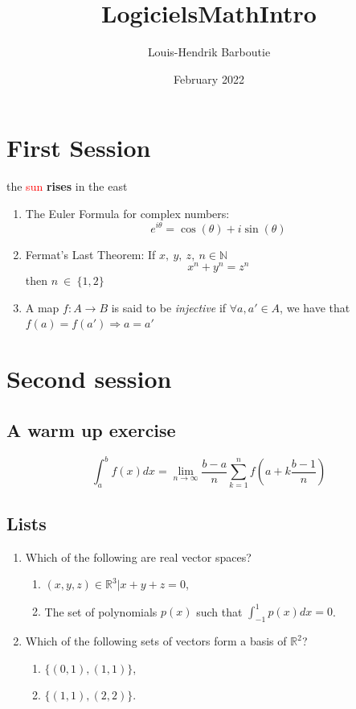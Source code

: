 \documentclass{article} %
\title{LogicielsMathIntro}
\author{Louis-Hendrik Barboutie}
\date{February 2022}
\theoremstyle{definition}
\theoremstyle{definition}
\begin{document}
\maketitle

\clearpage

\tableofcontents

\clearpage

\section{First Session}

the {\Large\textcolor{red}{sun} \textbf{rises}} in the east

\begin{enumerate}
    \item The Euler Formula for complex numbers:
        \[e^{i\theta} = \cos(\theta) + i\sin(\theta)\]
    \item Fermat's Last Theorem: If $x, \ y, \ z, \ n \in \mathbb{N}$
        \[x^n + y^n = z^n\]
        then $n \ \in \ \{1,2\}$
    \item A map $f:A \rightarrow B$ is said to be \textit{injective} if $\forall         a, a' \in  A$, we have that $f(a) = f(a') \Rightarrow a = a'$

\end{enumerate}

\section{Second session}

\subsection{A warm up exercise}
\[ \int_a^b f(x)dx = \lim_{n \to \infty} \frac{b-a}{n} \sum_{k=1}^{n}f(a+k\frac{b-1}{n})\]

\subsection{Lists}
\begin{enumerate}
    \item Which of the following are real vector spaces?
    \begin{enumerate}[label=(\alph*)]
        \item ${(x,y,z) \in \mathbb{R}^3| x+y+z=0}$,
        \item The set of polynomials $p(x)$ such that $\int_{-1}^1p(x)dx = 0$.
    \end{enumerate}
    \item Which of the following sets of vectors form a basis of $\mathbb{R}^2$?
    \begin{enumerate}[label=\roman*)]
        \item $\{ (0,1),(1,1) \}$,
        \item $\{ (1,1),(2,2) \}$.
    \end{enumerate}
\end{enumerate}
\end{document}
